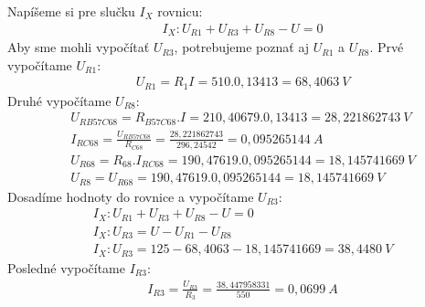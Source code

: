 Napíšeme si pre slučku $I_{X}$ rovnicu:
\begin{align*}
    &I_{X}: U_{R1} + U_{R3} + U_{R8} - U = 0 
\end{align*}
Aby sme mohli vypočítať $U_{R3}$, potrebujeme poznať aj $U_{R1}$ a $U_{R8}$. Prvé vypočítame $U_{R1}$:
\begin{align*}
&U_{R1} = R_{1} I = 510 . 0,13413 = 68,4063~V 
\end{align*}
Druhé vypočítame $U_{R8}$:
\begin{align*}
&U_{RB57C68} = R_{B57C68}.I = 210,40679 . 0,13413 = 28,221862743~V \\
&I_{RC68} = \frac{U_{RB57C68}}{R_{C68}} = \frac{28,221862743}{296,24542} = 0,095265144~A \\
&U_{R68} = R_{68}.I_{RC68} = 190,47619.0,095265144 = 18,145741669~V \\
&U_{R8} = U_{R68}  = 190,47619.0,095265144 = 18,145741669~V 
\end{align*}
Dosadíme hodnoty do rovnice a vypočítame $U_{R3}$: 
\begin{align*} &I_{X}: U_{R1} + U_{R3} + U_{R8} - U = 0 \\
&I_{X}: U_{R3} = U - U_{R1} - U_{R8} \\
&I_{X}: U_{R3} = 125 - 68,4063 - 18,145741669 = 38,4480~V 
\end{align*}
Posledné vypočítame $I_{R3}$:
\begin{align*}
&I_{R3} = \frac{U_{R3}}{R_{3}} = \frac{38,447958331}{550} = 0,0699~A
\end{align*}
\newpage
